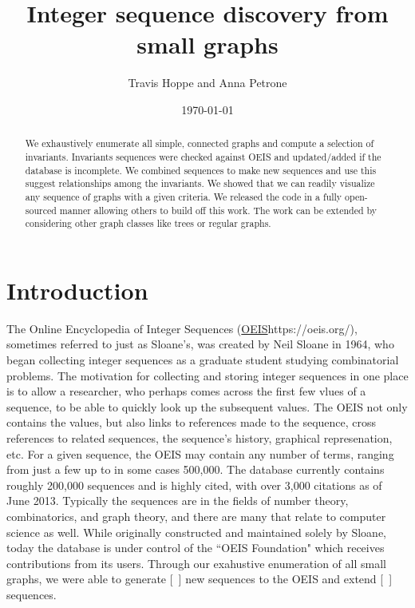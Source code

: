 \documentclass[12pt]{article}
\begin{document}
\setlength{\parindent}{0cm}

\title{Integer sequence discovery from small graphs}
\author{Travis Hoppe and Anna Petrone}
\date{\today}
\maketitle

\begin{abstract}
We exhaustively enumerate all simple, connected graphs and compute a selection of invariants. 
Invariants sequences were checked against OEIS and updated/added if the database is incomplete.
We combined sequences to make new sequences and use this suggest relationships among the invariants.
We showed that we can readily visualize any sequence of graphs with a given criteria.
We released the code in a fully open-sourced manner allowing others to build off this work.
The work can be extended by considering other graph classes like trees or regular graphs.
\end{abstract}

\section{Introduction}

The Online Encyclopedia of Integer Sequences (\url{OEIS}{https://oeis.org/}), sometimes referred to just as Sloane's, was created by Neil Sloane in 1964, who began collecting integer sequences as a graduate student studying combinatorial problems. The motivation for collecting and storing integer sequences in one place is to allow a researcher, who perhaps comes across the first few vlues of a sequence, to be able to quickly look up the subsequent values. The OEIS not only contains the values, but also links to references made to the sequence, cross references to related sequences, the sequence's history, graphical represenation, etc. For a given sequence, the OEIS may contain any number of terms, ranging from just a few up to  in some cases 500,000. The database currently contains roughly 200,000 sequences and is highly cited, with over 3,000 citations as of June 2013. Typically the sequences are in the fields of number theory, combinatorics, and graph theory, and there are many that relate to computer science as well. While originally constructed and maintained solely by Sloane, today the database is under control of the ``OEIS Foundation" which receives contributions from its users. Through our exahustive enumeration of all small graphs, we were able to generate [\ ] new sequences to the OEIS and extend [\ ] sequences. \\
\end{document}
